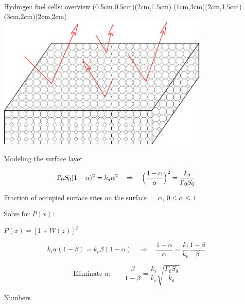 \documentclass[12pt,a4paper,CJK]{beamer}
\begin{document}
\begin{CJK*}{UTF8}{gkai}
\begin{frame}{Hydrogen fuel cells: overview}
(0.5cm,0.5cm)(2cm,1.5cm)
(1cm,3cm)(2cm,1.5cm)
(3cm,2cm)(2cm,2cm)
\includegraphics[width=0.8\textwidth]{figs/bounce.pdf}
\end{frame}

\begin{frame}{Modeling the surface layer}

\[
  \Gamma_0 S_0 (1-\alpha)^2 = k_d \alpha^2
  \quad \Rightarrow \quad
  \Bigl(\frac{1-\alpha}{\alpha}\Bigr)^2 = \frac{k_d}{\Gamma_0 S_0}
\]

Fraction of occupied surface sites on the surface $ = \alpha$, \quad
$0 \le \alpha \le 1$

\medskip

\begin{center}
  Solve for $P(x)$:\qquad
  \begin{onlinebox}{45mm} 
  	$\displaystyle P(x) = [ 1 + W(z)]^2$
  \end{onlinebox}
\end{center}

\medskip

\begin{displaybox}{90mm}
\[
  k_i \alpha (1-\beta) = k_o \beta (1-\alpha)
  \quad \Rightarrow \quad
  \frac{1-\alpha}{\alpha} = \frac{k_i}{k_o} \frac{1-\beta}{\beta}
\]

\[
  \text{Eliminate $\alpha$:} \qquad
  \frac{\beta}{1-\beta} = \frac{k_i}{k_o}
  \sqrt{\frac{\Gamma_0S_0}{k_d}} 
\]
\end{displaybox}
\end{frame}

\begin{frame}{Numbers}



\end{frame}
\end{CJK*}
\end{document}
